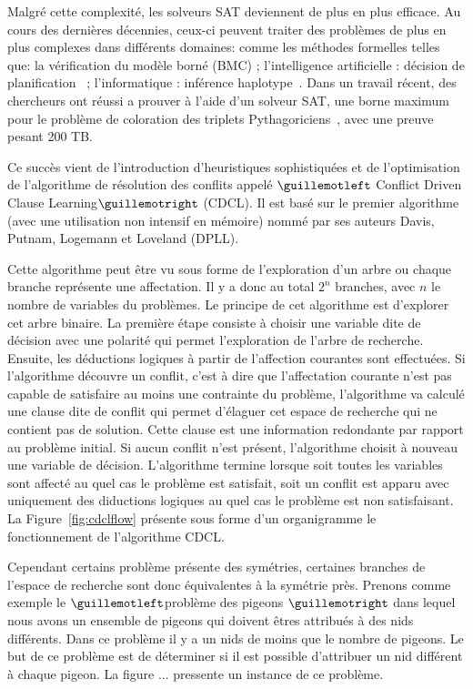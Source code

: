 Malgré cette complexité, les solveurs SAT deviennent de plus en plus efficace.
Au cours des dernières décennies, ceux-ci peuvent traiter des problèmes de plus en plus complexes dans différents domaines: comme les méthodes formelles telles que: la vérification du modèle borné (BMC)\cite{bmc_99} ; l'intelligence artificielle : décision de planification~\cite{planning_92} ; l'informatique : inférence haplotype~\cite{biology_06}. 
Dans un travail récent, des chercheurs ont réussi a prouver à l'aide d'un solveur SAT, une borne maximum
pour le problème de coloration des triplets Pythagoriciens~\cite{heule2016solving}, avec une preuve pesant 200 TB.

Ce succès vient de l'introduction d'heuristiques sophistiquées et de l'optimisation de l'algorithme de
résolution des conflits appelé $\guillemotleft$ Conflict Driven Clause Learning$\guillemotright$ (CDCL). Il est basé sur le premier
algorithme (avec une utilisation non intensif en mémoire) nommé par ses auteurs Davis, Putnam, Logemann
et Loveland (DPLL)\cite{dpll_62}.


Cette algorithme peut être vu sous forme de l'exploration d'un arbre ou chaque branche représente 
une affectation. Il y a donc au total $2^n$ branches, avec $n$ le nombre de variables du problèmes.
Le principe de cet algorithme est d'explorer cet arbre binaire. 
La première étape consiste à choisir une variable dite de décision avec une polarité qui permet l'exploration
de l'arbre de recherche. Ensuite, les déductions logiques à partir de l'affection courantes sont effectuées. 
Si l'algorithme découvre un conflit, c'est à dire que l'affectation courante n'est pas capable de satisfaire au moins une contrainte du problème, l'algorithme va calculé une clause dite de conflit qui permet d'élaguer 
cet espace de recherche qui ne contient pas de solution. Cette clause est une information redondante par
rapport au problème initial. Si aucun conflit n'est présent, l'algorithme choisit à nouveau une variable de décision. L'algorithme termine lorsque soit toutes les variables sont affecté au quel cas le problème 
est satisfait, soit un conflit est apparu avec uniquement des diductions logiques au quel cas le
problème est non satisfaisant.
La Figure~\ref{fig:cdclflow} présente sous forme d'un organigramme le fonctionnement de l'algorithme CDCL.




Cependant certains problème présente des symétries, certaines branches de l'espace de recherche 
sont donc équivalentes à la symétrie près. Prenons comme exemple le $\guillemotleft$problème des pigeons $\guillemotright$ dans lequel nous avons un ensemble de pigeons qui doivent êtres attribués à des nids différents. Dans ce problème il y a un nids de moins que le nombre de pigeons.
Le but de ce problème est de déterminer si il est possible d'attribuer un nid différent à chaque pigeon.
 La figure ... pressente un instance de ce problème.
 
